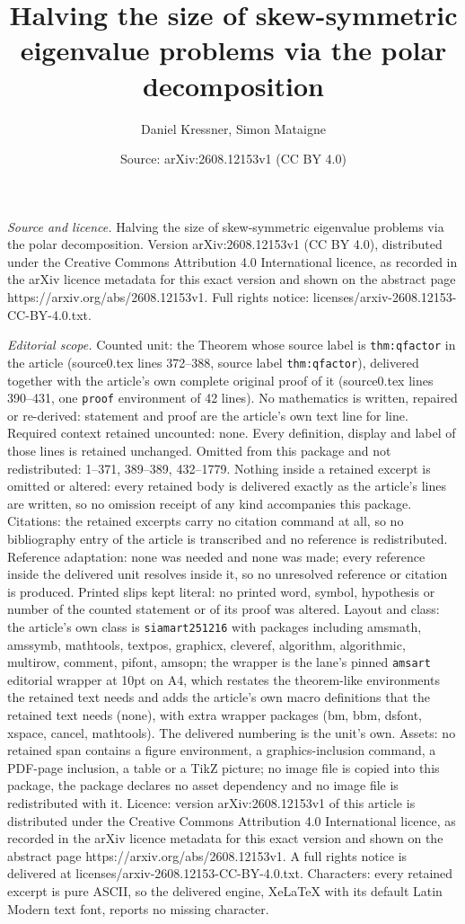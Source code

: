 \documentclass[10pt,a4paper]{amsart}
\title[Halving the size of skew-symmetric eigenvalue problems via t]{Halving the size of skew-symmetric eigenvalue problems via the polar decomposition}
\author{Daniel Kressner, Simon Mataigne}
\date{Source: arXiv:2608.12153v1 (CC BY 4.0)}
\begin{document}
\maketitle

\noindent\emph{Source and licence.} Halving the size of skew-symmetric eigenvalue problems via the polar decomposition. Version arXiv:2608.12153v1 (CC BY 4.0), distributed under the Creative Commons Attribution 4.0 International licence, as recorded in the arXiv licence metadata for this exact version and shown on the abstract page https://arxiv.org/abs/2608.12153v1. Full rights notice: licenses/arxiv-2608.12153-CC-BY-4.0.txt.\par\smallskip

\noindent\textit{Editorial scope.} Counted unit: the Theorem whose source label is \texttt{thm:qfactor} in the article (source0.tex lines 372--388, source label \texttt{thm:qfactor}), delivered together with the article's own complete original proof of it (source0.tex lines 390--431, one \texttt{proof} environment of 42 lines). No mathematics is written, repaired or re-derived: statement and proof are the article's own text line for line. Required context retained uncounted: none. Every definition, display and label of those lines is retained unchanged. Omitted from this package and not redistributed: 1--371, 389--389, 432--1779. Nothing inside a retained excerpt is omitted or altered: every retained body is delivered exactly as the article's lines are written, so no omission receipt of any kind accompanies this package. Citations: the retained excerpts carry no citation command at all, so no bibliography entry of the article is transcribed and no reference is redistributed. Reference adaptation: none was needed and none was made; every reference inside the delivered unit resolves inside it, so no unresolved reference or citation is produced. Printed slips kept literal: no printed word, symbol, hypothesis or number of the counted statement or of its proof was altered. Layout and class: the article's own class is \texttt{siamart251216} with packages including amsmath, amssymb, mathtools, textpos, graphicx, cleveref, algorithm, algorithmic, multirow, comment, pifont, amsopn; the wrapper is the lane's pinned \texttt{amsart} editorial wrapper at 10pt on A4, which restates the theorem-like environments the retained text needs and adds the article's own macro definitions that the retained text needs (none), with extra wrapper packages (bm, bbm, dsfont, xspace, cancel, mathtools). The delivered numbering is the unit's own. Assets: no retained span contains a figure environment, a graphics-inclusion command, a PDF-page inclusion, a table or a TikZ picture; no image file is copied into this package, the package declares no asset dependency and no image file is redistributed with it. Licence: version arXiv:2608.12153v1 of this article is distributed under the Creative Commons Attribution 4.0 International licence, as recorded in the arXiv licence metadata for this exact version and shown on the abstract page https://arxiv.org/abs/2608.12153v1. A full rights notice is delivered at licenses/arxiv-2608.12153-CC-BY-4.0.txt. Characters: every retained excerpt is pure ASCII, so the delivered engine, XeLaTeX with its default Latin Modern text font, reports no missing character.
\end{document}
